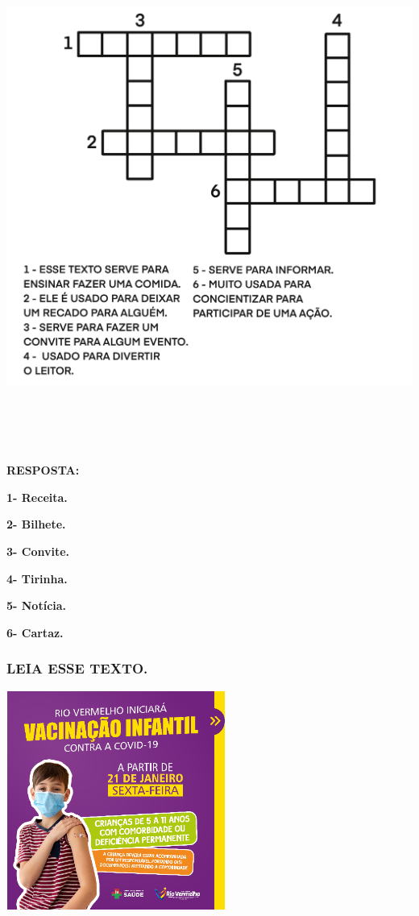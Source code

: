 \begin{escola}
\includegraphics[width=5.80417in,height=6.50556in]{media/image155.png}

\protect\hypertarget{_heading=h.vv31p5wq2469}{}{}

\textbf{RESPOSTA:}

\textbf{1- Receita.}

\textbf{2- Bilhete.}

\textbf{3- Convite.}

\textbf{4- Tirinha.}

\textbf{5- Notícia.}

\textbf{6- Cartaz.}

\subsubsection{LEIA ESSE TEXTO.}\label{leia-esse-texto.}

\includegraphics[width=2.82569in,height=2.82569in]{media/image156.png}


\end{escola}
